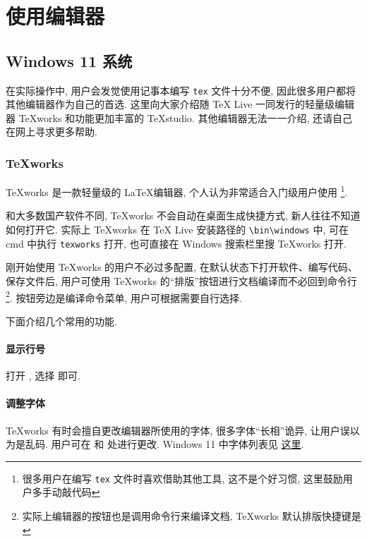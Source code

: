 
\chapter{使用编辑器}

\section{Windows 11 系统}

在实际操作中, 用户会发觉使用记事本编写 \texttt{tex} 文件十分不便,
因此很多用户都将其他编辑器作为自己的首选.
这里向大家介绍随 \TeX{} Live 一同发行的轻量级编辑器 \TeX works
和功能更加丰富的
\TeX studio.
其他编辑器无法一一介绍, 还请自己在网上寻求更多帮助. 

\subsection{\TeX works}

\TeX works 是一款轻量级的 \LaTeX 编辑器, 个人认为非常适合入门级用户使用%
\footnote{很多用户在编写 \texttt{tex} 文件时喜欢借助其他工具,
这不是个好习惯, 这里鼓励用户多手动敲代码}. 

和大多数国产软件不同, \TeX works 不会自动在桌面生成快捷方式,
新人往往不知道如何打开它. 
实际上 \TeX works 在 \TeX{} Live 安装路径的
\texttt{\textbackslash bin\textbackslash windows} 中,
可在 \textsf{cmd} 中执行 \texttt{texworks} 打开,
也可直接在 Windows 搜索栏里搜 \TeX works 打开. 

刚开始使用 \TeX works 的用户不必过多配置,
在默认状态下打开软件、编写代码、保存文件后,
用户可使用 \TeX works 的“排版”按钮进行文档编译而不必回到命令行%
\footnote{实际上编辑器的按钮也是调用命令行来编译文档,
\TeX works 默认排版快捷键是 }. 
按钮旁边是编译命令菜单, 用户可根据需要自行选择. 

下面介绍几个常用的功能. 

\subsubsection{显示行号}

打开 , 选择  即可. 

\subsubsection{调整字体}

\TeX works 有时会擅自更改编辑器所使用的字体,
很多字体``长相''诡异,
让用户误以为是乱码.
用户可在 
和  处进行更改.
Windows 11 中字体列表见%
\href{https://docs.microsoft.com/en-us/typography/fonts/windows_11_font_list}{这里}.


